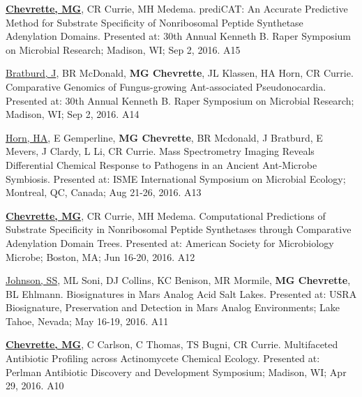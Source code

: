 \begin{cvpubs}

  \cvpub
    {\textbf{\underline{Chevrette, MG}}, CR Currie, MH Medema.  prediCAT: An Accurate Predictive Method for Substrate Specificity of Nonribosomal Peptide Synthetase Adenylation Domains.  Presented at: 30th Annual Kenneth B. Raper Symposium on Microbial Research; Madison, WI; Sep 2, 2016.} %
    {A15} %

  \cvpub
    {\underline{Bratburd, J}, BR McDonald, \textbf{MG Chevrette}, JL Klassen, HA Horn, CR Currie.  Comparative Genomics of Fungus-growing Ant-associated Pseudonocardia.  Presented at: 30th Annual Kenneth B. Raper Symposium on Microbial Research; Madison, WI; Sep 2, 2016.} %
    {A14} %
    
  \cvpub
    {\underline{Horn, HA}, E Gemperline, \textbf{MG Chevrette}, BR Mcdonald, J Bratburd, E Mevers, J Clardy, L Li, CR Currie.  Mass Spectrometry Imaging Reveals Differential Chemical Response to Pathogens in an Ancient Ant-Microbe Symbiosis.  Presented at: ISME International Symposium on Microbial Ecology; Montreal, QC, Canada; Aug 21-26, 2016.} %
    {A13} %


  \cvpub
    {\textbf{\underline{Chevrette, MG}}, CR Currie, MH Medema.  Computational Predictions of Substrate Specificity in Nonribosomal Peptide Synthetases through Comparative Adenylation Domain Trees.  Presented at: American Society for Microbiology Microbe; Boston, MA; Jun 16-20, 2016.} %
    {A12} %
    
  \cvpub
    {\underline{Johnson, SS}, ML Soni, DJ Collins, KC Benison, MR Mormile, \textbf{MG Chevrette}, BL Ehlmann.  Biosignatures in Mars Analog Acid Salt Lakes.  Presented at: USRA Biosignature, Preservation and Detection in Mars Analog Environments; Lake Tahoe, Nevada; May 16-19, 2016.} %
    {A11} %

  \cvpub
    {\textbf{\underline{Chevrette, MG}}, C Carlson, C Thomas, TS Bugni, CR Currie.  Multifaceted Antibiotic Profiling across Actinomycete Chemical Ecology.  Presented at: Perlman Antibiotic Discovery and Development Symposium; Madison, WI; Apr 29, 2016.} %
    {A10} %


\end{cvpubs}
